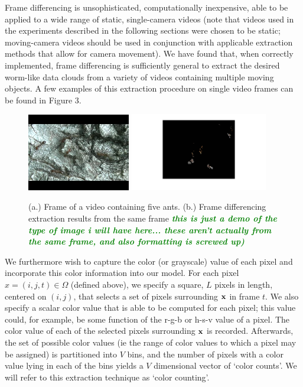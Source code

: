 \documentclass{article}
\newcommand{\willie}[1]{\textcolor{green}{\textsf{\emph{\textbf{\textcolor{green}{#1}}}}}}
\begin{document}
Frame differencing is unsophisticated, computationally inexpensive, able to be applied to a wide range of static, single-camera videos (note that videos used in the experiments described in the following sections were chosen to be static; moving-camera videos should be used in conjunction with applicable extraction methods that allow for camera movement). We have found that, when correctly implemented, frame differencing is sufficiently general to extract the desired worm-like data clouds from a variety of videos containing multiple moving objects. A few examples of this extraction procedure on single video frames can be found in Figure 3.

\begin{figure}
\centering
{\includegraphics[width=45mm]{antpic2.png}}
{\includegraphics[width=60mm]{frame_diff_ants_1.png}}
\caption{(a.) Frame of a video containing five ants. (b.) Frame differencing extraction results from the same frame \willie{this is just a demo of the type of image i will have here... these aren't actually from the same frame, and also formatting is screwed up)}}
\label{test}
\end{figure}

We furthermore wish to capture the color (or grayscale) value of each pixel and incorporate this color information into our model. For each pixel $x = (i, j, t) \in \Omega$ (defined above), we specify a square, $L$ pixels in length, centered on $(i, j)$, that selects a set of pixels surrounding $\bold{x}$ in frame $t$. We also specify a scalar color value that is able to be computed for each pixel; this value could, for example, be some function of the r-g-b or h-s-v value of a pixel. The color value of each of the selected pixels surrounding $\bold{x}$ is recorded. Afterwards, the set of possible color values (ie the range of color values to which a pixel may be assigned) is partitioned into $V$ bins, and the number of pixels with a color value lying in each of the bins yields a $V$ dimensional vector of `color counts'. We will refer to this extraction technique as `color counting'.
\end{document}
